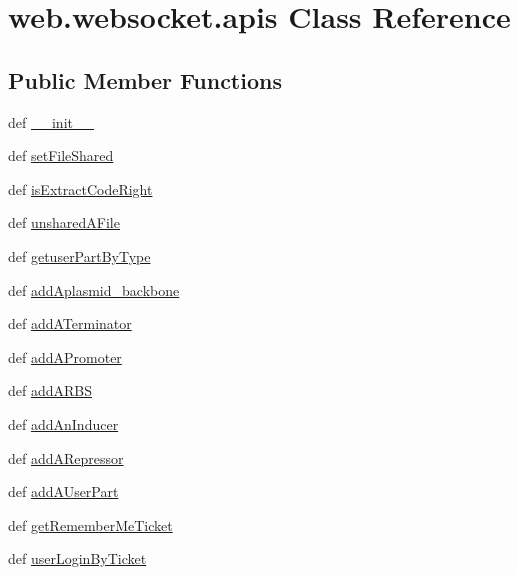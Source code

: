 \hypertarget{classweb_1_1websocket_1_1apis}{\section{web.\-websocket.\-apis Class Reference}
\label{classweb_1_1websocket_1_1apis}
}
\subsection*{Public Member Functions}
\begin{DoxyCompactItemize}
\item 
def \hyperlink{classweb_1_1websocket_1_1apis_a5238c2beaa2b1d0a072d166fd98fc59c}{\-\_\-\-\_\-init\-\_\-\-\_\-}
\item 
def \hyperlink{classweb_1_1websocket_1_1apis_a3fec76d778807e6ac958f69df5bcbe43}{set\-File\-Shared}
\item 
def \hyperlink{classweb_1_1websocket_1_1apis_afad457c5d1683e83f299b5a8e8bc6895}{is\-Extract\-Code\-Right}
\item 
def \hyperlink{classweb_1_1websocket_1_1apis_ae947e9a3c9305e06bab8212626109552}{unshared\-A\-File}
\item 
def \hyperlink{classweb_1_1websocket_1_1apis_ace60e93cc4fecdeea005b8767b4d9746}{getuser\-Part\-By\-Type}
\item 
def \hyperlink{classweb_1_1websocket_1_1apis_a4a974f66e9b0a2f3cc111babac7f0b21}{add\-Aplasmid\-\_\-backbone}
\item 
def \hyperlink{classweb_1_1websocket_1_1apis_af064ec186d51b795f5e529fcefaaa2b5}{add\-A\-Terminator}
\item 
def \hyperlink{classweb_1_1websocket_1_1apis_a5c1e119a65ed3da3ae047fb605b99cda}{add\-A\-Promoter}
\item 
def \hyperlink{classweb_1_1websocket_1_1apis_aaf96d3818088ac926a36404c7b8be002}{add\-A\-R\-B\-S}
\item 
def \hyperlink{classweb_1_1websocket_1_1apis_ac7d13ca993fe6d352f0852eabf04aeb8}{add\-An\-Inducer}
\item 
def \hyperlink{classweb_1_1websocket_1_1apis_afb2b5ae19e109e03b5de6f9e8918141c}{add\-A\-Repressor}
\item 
def \hyperlink{classweb_1_1websocket_1_1apis_a1196854adab730ec70da24c055702f03}{add\-A\-User\-Part}
\item 
def \hyperlink{classweb_1_1websocket_1_1apis_a232a5bd04230c96e4ea601f5622655e8}{get\-Remember\-Me\-Ticket}
\item 
def \hyperlink{classweb_1_1websocket_1_1apis_a4fbe2f5d57955ba593a6610d79e31ff6}{user\-Login\-By\-Ticket}

\end{DoxyCompactItemize}
